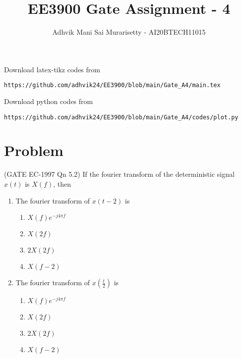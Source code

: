 \documentclass[journal,12pt,twocolumn]{IEEEtran}
\begin{document}
\vspace{3cm}
\title{EE3900 Gate Assignment - 4}
\author{Adhvik Mani Sai Murarisetty - AI20BTECH11015}
\maketitle
\newpage
\bigskip
\renewcommand{\thetable}{\theenumi}

Download latex-tikz codes from 
%
\begin{lstlisting}
https://github.com/adhvik24/EE3900/blob/main/Gate_A4/main.tex
\end{lstlisting}
%
Download python codes from 
%
\begin{lstlisting}
https://github.com/adhvik24/EE3900/blob/main/Gate_A4/codes/plot.py
\end{lstlisting}
\section*{Problem}
(GATE EC-1997 Qn 5.2) If the fourier transform of the deterministic signal $x(t)$ is $X(f)$, then
\begin{enumerate}
    \item The fourier transform of $x(t-2)$ is
    \begin{enumerate} 
        \item $X(f)e^{-j4\pi f}$
        \item $X(2f)$
        \item $2X(2f)$
        \item $X(f-2)$
    \end{enumerate}
    \item The fourier transform of $x(\frac{t}{2})$ is
    \begin{enumerate} 
        \item $X(f)e^{-j4\pi f}$
        \item $X(2f)$
        \item $2X(2f)$
        \item $X(f-2)$
    \end{enumerate}
\end{enumerate}
\end{document}

